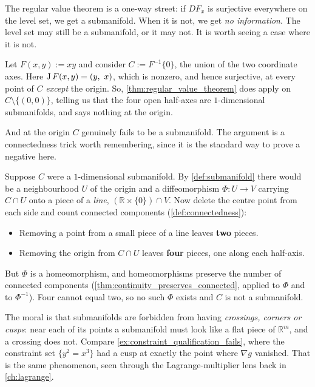 \begin{aiexample}
\label{ex:cross_not_submanifold}
The regular value theorem is a one-way street: if $DF_x$ is surjective everywhere on the level
set, we get a submanifold. When it is not, we get \emph{no information}. The level set may still
be a submanifold, or it may not. It is worth seeing a case where it is not.

Let $F(x,y) := xy$ and consider $C := F^{-1}\{0\}$, the union of the two coordinate axes.
Here $\operatorname{J} F(x,y) = (y,\ x)$, which is nonzero, and hence surjective, at every point of $C$
\emph{except} the origin. So, \cref{thm:regular_value_theorem} does apply on
$C \setminus \{(0,0)\}$, telling us that the four open half-axes are $1$-dimensional
submanifolds, and says nothing at the origin.

And at the origin $C$ genuinely fails to be a submanifold. The argument is a connectedness trick
worth remembering, since it is the standard way to prove a negative here.

Suppose $C$ were a $1$-dimensional submanifold. By \cref{def:submanifold} there would be a
neighbourhood $U$ of the origin and a diffeomorphism $\Phi : U \to V$ carrying $C \cap U$ onto a
piece of a \emph{line}, $(\mathbb{R}\times\{0\})\cap V$. Now delete the centre point from each
side and count connected components (\cref{def:connectedness}):
\begin{itemize}
  \item Removing a point from a small piece of a line leaves \textbf{two} pieces.
  \item Removing the origin from $C \cap U$ leaves \textbf{four} pieces, one along each
    half-axis.
\end{itemize}
But $\Phi$ is a homeomorphism, and homeomorphisms preserve the number of connected components
(\cref{thm:continuity_preserves_connected}, applied to $\Phi$ and to $\Phi^{-1}$). Four cannot
equal two, so no such $\Phi$ exists and $C$ is not a submanifold.

\begin{remark}
The moral is that submanifolds are forbidden from having \emph{crossings, corners or cusps}: near
each of its points a submanifold must look like a flat piece of $\mathbb{R}^m$, and a crossing
does not. Compare \cref{ex:constraint_qualification_fails}, where the constraint set
$\{y^2=x^3\}$ had a cusp at exactly the point where $\nabla g$ vanished. That is the same
phenomenon, seen through the Lagrange-multiplier lens back in \cref{ch:lagrange}.
\end{remark}
\end{aiexample}

